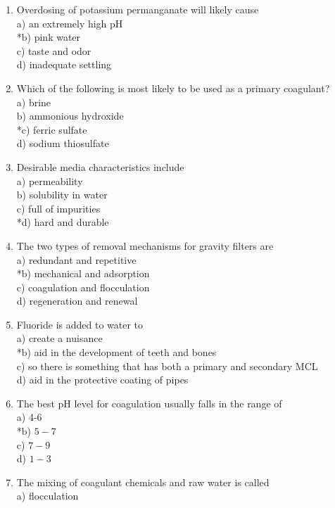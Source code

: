 \begin{enumerate}
  \item Overdosing of potassium permanganate will likely cause\\
a) an extremely high $\mathrm{pH}$\\
*b) pink water\\
c) taste and odor\\
d) inadequate settling\\
  \item Which of the following is most likely to be used as a primary coagulant?\\
a) brine\\
b) ammonious hydroxide\\
*c) ferric sulfate\\
d) sodium thiosulfate\\
\item Desirable media characteristics include\\
a) permeability\\
b) solubility in water\\
c) full of impurities\\
*d) hard and durable\\
  \item The two types of removal mechanisms for gravity filters are\\
a) redundant and repetitive\\
*b) mechanical and adsorption\\
c) coagulation and flocculation\\
d) regeneration and renewal\\
  \item Fluoride is added to water to\\
a) create a nuisance\\
*b) aid in the development of teeth and bones\\
c) so there is something that has both a primary and secondary MCL\\
d) aid in the protective coating of pipes\\
\item The best pH level for coagulation usually falls in the range of\\
a) 4-6\\
*b) $5-7$\\
c) $7-9$\\
d) $1-3$\\
  \item The mixing of coagulant chemicals and raw water is called\\
a) flocculation\\

\end{enumerate}
